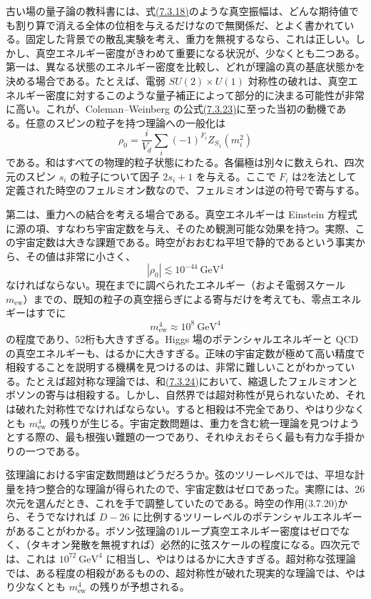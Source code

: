 古い場の量子論の教科書には、式\hyperref[eq:7.3.18]{(7.3.18)}のような真空振幅は、どんな期待値でも割り算で消える全体の位相を与えるだけなので無関係だ、とよく書かれている。固定した背景での散乱実験を考え、重力を無視するなら、これは正しい。しかし、真空エネルギー密度がきわめて重要になる状況が、少なくとも二つある。第一は、異なる状態のエネルギー密度を比較し、どれが理論の真の基底状態かを決める場合である。たとえば、電弱 $SU(2)\times U(1)$ 対称性の破れは、真空エネルギー密度に対するこのような量子補正によって部分的に決まる可能性が非常に高い。これが、Coleman--Weinberg の公式\hyperref[eq:7.3.23]{(7.3.23)}に至った当初の動機である。任意のスピンの粒子を持つ理論への一般化は
\begin{equation}
\rho_0=\frac i{V_d}\sum_i(-1)^{F_i}Z_{S_1}(m_i^2)
\tag{7.3.24}\label{eq:7.3.24}
\end{equation}
である。和はすべての物理的粒子状態にわたる。各偏極は別々に数えられ、四次元のスピン $s_i$ の粒子について因子 $2s_i+1$ を与える。ここで $F_i$ は2を法として定義された時空のフェルミオン数なので、フェルミオンは逆の符号で寄与する。

第二は、重力への結合を考える場合である。真空エネルギーは Einstein 方程式に源の項、すなわち宇宙定数を与え、そのため観測可能な効果を持つ。実際、この宇宙定数は大きな課題である。時空がおおむね平坦で静的であるという事実から、その値は非常に小さく、
\begin{equation}
|\rho_0|\lesssim10^{-44}\ \mathrm{GeV}^4
\tag{7.3.25}\label{eq:7.3.25}
\end{equation}
なければならない。現在までに調べられたエネルギー（およそ電弱スケール $m_{\mathrm{ew}}$）までの、既知の粒子の真空揺らぎによる寄与だけを考えても、零点エネルギーはすでに
\begin{equation}
m_{\mathrm{ew}}^4\approx10^8\ \mathrm{GeV}^4
\tag{7.3.26}\label{eq:7.3.26}
\end{equation}
の程度であり、52桁も大きすぎる。Higgs 場のポテンシャルエネルギーと QCD の真空エネルギーも、はるかに大きすぎる。正味の宇宙定数が極めて高い精度で相殺することを説明する機構を見つけるのは、非常に難しいことがわかっている。たとえば超対称な理論では、和\hyperref[eq:7.3.24]{(7.3.24)}において、縮退したフェルミオンとボソンの寄与は相殺する。しかし、自然界では超対称性が見られないため、それは破れた対称性でなければならない。すると相殺は不完全であり、やはり少なくとも $m_{\mathrm{ew}}^4$ の残りが生じる。宇宙定数問題は、重力を含む統一理論を見つけようとする際の、最も根強い難題の一つであり、それゆえおそらく最も有力な手掛かりの一つである。

弦理論における宇宙定数問題はどうだろうか。弦のツリーレベルでは、平坦な計量を持つ整合的な理論が得られたので、宇宙定数はゼロであった。実際には、26次元を選んだとき、これを手で調整していたのである。時空の作用(3.7.20)から、そうでなければ $D-26$ に比例するツリーレベルのポテンシャルエネルギーがあることがわかる。ボソン弦理論の1ループ真空エネルギー密度はゼロでなく、（タキオン発散を無視すれば）必然的に弦スケールの程度になる。四次元では、これは $10^{72}\ \mathrm{GeV}^4$ に相当し、やはりはるかに大きすぎる。超対称な弦理論では、ある程度の相殺があるものの、超対称性が破れた現実的な理論では、やはり少なくとも $m_{\mathrm{ew}}^4$ の残りが予想される。

